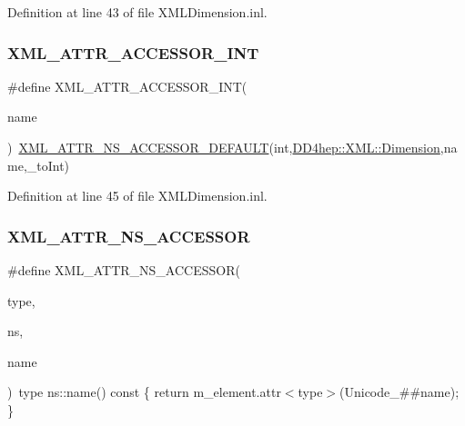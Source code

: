 Definition at line 43 of file X\+M\+L\+Dimension.\+inl.

\hypertarget{_x_m_l_dimension_8inl_aa9f53a44681848d2aeda1c5cdac2efb8}{}\label{_x_m_l_dimension_8inl_aa9f53a44681848d2aeda1c5cdac2efb8} 
\subsubsection{\texorpdfstring{X\+M\+L\+\_\+\+A\+T\+T\+R\+\_\+\+A\+C\+C\+E\+S\+S\+O\+R\+\_\+\+I\+NT}{XML\_ATTR\_ACCESSOR\_INT}}
{\footnotesize\ttfamily \#define X\+M\+L\+\_\+\+A\+T\+T\+R\+\_\+\+A\+C\+C\+E\+S\+S\+O\+R\+\_\+\+I\+NT(\begin{DoxyParamCaption}\item[{}]{name }\end{DoxyParamCaption})~\hyperlink{_x_m_l_dimension_8inl_a621d9cfc07f37e663ecb8f6c5bd22dfa}{X\+M\+L\+\_\+\+A\+T\+T\+R\+\_\+\+N\+S\+\_\+\+A\+C\+C\+E\+S\+S\+O\+R\+\_\+\+D\+E\+F\+A\+U\+LT}(int,\hyperlink{struct_d_d4hep_1_1_x_m_l_1_1_dimension}{D\+D4hep\+::\+X\+M\+L\+::\+Dimension},name,\+\_\+to\+Int)}



Definition at line 45 of file X\+M\+L\+Dimension.\+inl.

\hypertarget{_x_m_l_dimension_8inl_a712f343791889ac7912b917b64ccb32a}{}\label{_x_m_l_dimension_8inl_a712f343791889ac7912b917b64ccb32a} 
\subsubsection{\texorpdfstring{X\+M\+L\+\_\+\+A\+T\+T\+R\+\_\+\+N\+S\+\_\+\+A\+C\+C\+E\+S\+S\+OR}{XML\_ATTR\_NS\_ACCESSOR}}
{\footnotesize\ttfamily \#define X\+M\+L\+\_\+\+A\+T\+T\+R\+\_\+\+N\+S\+\_\+\+A\+C\+C\+E\+S\+S\+OR(\begin{DoxyParamCaption}\item[{}]{type,  }\item[{}]{ns,  }\item[{}]{name }\end{DoxyParamCaption})~type ns\+::name() const \{ return m\+\_\+element.\+attr$<$type$>$(Unicode\+\_\+\#\#name); \}}



